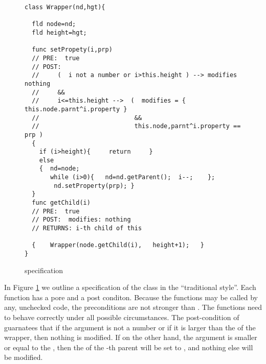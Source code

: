 \begin{figure}[htb]
\begin{lstlisting}
class Wrapper(nd,hgt){

  fld node=nd;
  fld height=hgt;

  func setPropety(i,prp)
  // PRE:  true
  // POST:
  //     (  i not a number or i>this.height ) --> modifies nothing  
  //     &&
  //     i<=this.height -->  (  modifies = { this.node.parnt^i.property }
  //                          &&
  //                          this.node,parnt^i.property == prp )
  {
    if (i>height){     return     } 
    else  
    {  nd=node;  
       while (i>0){   nd=nd.getParent();  i--;    };
        nd.setProperty(prp); }
  }    
  func getChild(i)
  // PRE:  true
  // POST:  modifies: nothing
  // RETURNS: i-th child of this
  
  {    Wrapper(node.getChild(i),   height+1);   }                           
}
\end{lstlisting}
 \vspace*{-7mm}
\caption{ specification}
\label{fig:WrapperSpec}
\end{figure}

In Figure \ref{fig:WrapperSpec} we  outline a specification of the class  in the ``traditional style''. Each function has a pore and a post conditon. Because the functions may be called by any, unchecked code, the preconditions are not stronger than . The functions need to behave correctly under all possible circumstances.  The post-condition of  guarnatees that if the argument is not a number or if it is larger than the  of the wrapper, then nothing is modified. If on the other hand, the argument is smaller or equal to the , then the  of the -th parent will be set to , and nothing else will be modified.
